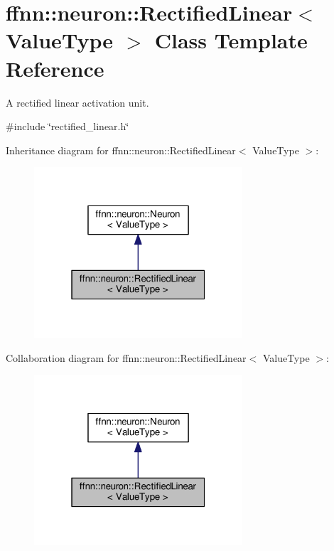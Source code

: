 \hypertarget{classffnn_1_1neuron_1_1_rectified_linear}{\section{ffnn\-:\-:neuron\-:\-:Rectified\-Linear$<$ Value\-Type $>$ Class Template Reference}
\label{classffnn_1_1neuron_1_1_rectified_linear}
}


A rectified linear activation unit.  




{\ttfamily \#include \char`\"{}rectified\-\_\-linear.\-h\char`\"{}}



Inheritance diagram for ffnn\-:\-:neuron\-:\-:Rectified\-Linear$<$ Value\-Type $>$\-:
\nopagebreak
\begin{figure}[H]
\begin{center}
\leavevmode
\includegraphics[width=220pt]{classffnn_1_1neuron_1_1_rectified_linear__inherit__graph}
\end{center}
\end{figure}


Collaboration diagram for ffnn\-:\-:neuron\-:\-:Rectified\-Linear$<$ Value\-Type $>$\-:
\nopagebreak
\begin{figure}[H]
\begin{center}
\leavevmode
\includegraphics[width=220pt]{classffnn_1_1neuron_1_1_rectified_linear__coll__graph}
\end{center}
\end{figure}
